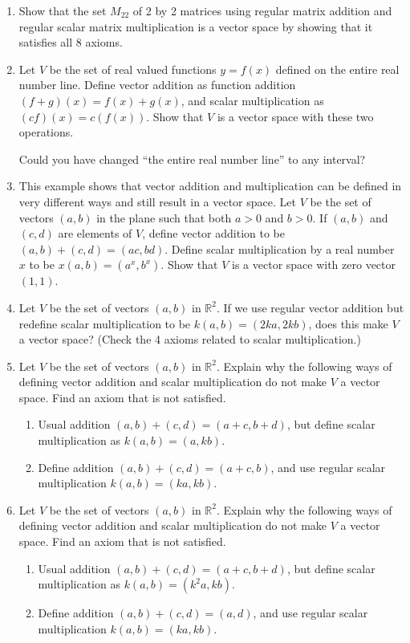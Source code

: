\begin{enumerate}
\begin{enumerate}
	\item Show that the set $M_{22}$ of 2 by 2 matrices using  regular matrix addition and regular scalar matrix multiplication is a vector space by showing that it satisfies all 8 axioms.
	\item Let $V$ be the set of real valued functions $y=f(x)$ defined on the entire real number line. Define vector addition as function addition $(f+g)(x) = f(x)+g(x)$, and scalar multiplication as $(cf)(x) = c(f(x))$. Show that $V$ is a vector space with these two operations. 
	
	Could you have changed ``the entire real number line'' to any interval?
	
	\item This example shows that vector addition and multiplication can be defined in very different ways and still result in a vector space. Let $V$ be the set of vectors $(a,b)$ in the plane such that both $a>0$ and $b>0$. If $(a,b)$ and $(c,d)$ are elements of $V$, define vector addition to be $(a,b)+(c,d) = (ac,bd)$.  Define scalar multiplication by a real number $x$ to be $x(a,b) = (a^x, b^x)$.  Show that $V$ is a vector space with zero vector $(1,1)$.

	\item Let $V$ be the set of vectors $(a,b)$ in $\mathbb{R}^2$. If we use regular vector addition but redefine scalar multiplication to be $k(a,b) = (2ka,2kb)$, does this make $V$ a vector space? (Check the 4 axioms related to scalar multiplication.)
	
	\item Let $V$ be the set of vectors $(a,b)$ in $\mathbb{R}^2$. Explain why the following ways of defining vector addition and scalar multiplication do not make $V$ a vector space. Find an axiom that is not satisfied.
\begin{enumerate}
	\item Usual addition $(a,b)+(c,d) = (a+c,b+d)$, but define scalar multiplication as $k(a,b) = (a,kb)$.
	\item Define addition $(a,b)+(c,d) = (a+c,b)$, and use regular scalar multiplication $k(a,b) = (ka,kb)$. 
\end{enumerate}


	\item Let $V$ be the set of vectors $(a,b)$ in $\mathbb{R}^2$. Explain why the following ways of defining vector addition and scalar multiplication do not make $V$ a vector space. Find an axiom that is not satisfied.
\begin{enumerate}
	\item Usual addition $(a,b)+(c,d) = (a+c,b+d)$, but define scalar multiplication as $k(a,b) = (k^2a,kb)$.
	\item Define addition $(a,b)+(c,d) = (a,d)$, and use regular scalar multiplication $k(a,b) = (ka,kb)$. 
\end{enumerate}



\end{enumerate}
\end{enumerate}
